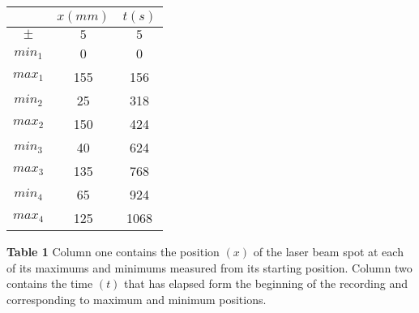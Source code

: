 \documentclass[12pt]{article}
\begin{document}
\newpage
\begin{center}
    \begin{threeparttable}\label{tab:time}
        \begin{tabular}{| c | c | c |}
            \hline
                & $x (mm)$ & $t (s)$\\ \hline
        $\pm$   & $5$ & $5$ \\ \hline 
        $min_1$ & 0   & 0    \\ \hline 
        $max_1$ & 155 & 156  \\ \hline 
        $min_2$ & 25  & 318  \\ \hline 
        $max_2$ & 150 & 424  \\ \hline 
        $min_3$ & 40  & 624  \\ \hline 
        $max_3$ & 135 & 768  \\ \hline 
        $min_4$ & 65  & 924  \\ \hline 
        $max_4$ & 125 & 1068 \\ \hline 
    \end{tabular}

    \begin{tablenotes}
\item \footnotesize \textbf{Table 1} Column one contains the position $(x)$ of the laser beam spot at each of its maximums and minimums measured from its starting position. Column two contains the time $(t)$ that has elapsed form the beginning of the recording and corresponding to maximum and minimum positions. 
    \end{tablenotes}
\end{threeparttable}
\end{center}
\end{document}
